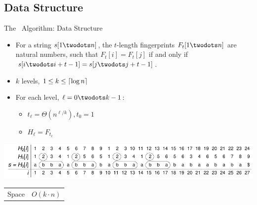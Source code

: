 \documentclass{beamer}
\begin{document}
\subsection{Data Structure}
\begin{frame}{The \fprintk\ Algorithm: Data Structure}
    \begin{itemize}
        \item For a string $s[1\twodots n]$, the $t$-length fingerprints $F_t[1\twodots n]$ are natural numbers, such that $F_t[i] = F_t[j]$ if and only if $s[i\twodots i+t-1] = s[j\twodots j+t-1]$.
        \item $k$ levels, $1\leq k\leq\lceil\log n\rceil$
        \item For each level, $\ell = 0\twodots k-1$:
        \begin{itemize}
            \item $t_\ell = \Theta(n^{\ell/k}), t_0=1$
            \item $H_\ell = F_{t_\ell}$
        \end{itemize}
    \end{itemize}
    \begin{center}
        \includegraphics[width=1\textwidth,page=1]{../doc/fingerprint.pdf}
    \end{center}
    \begin{tabular}{r l}
        Space & $O(k\cdot n)$\\
    \end{tabular}
\end{frame}
\end{document}
